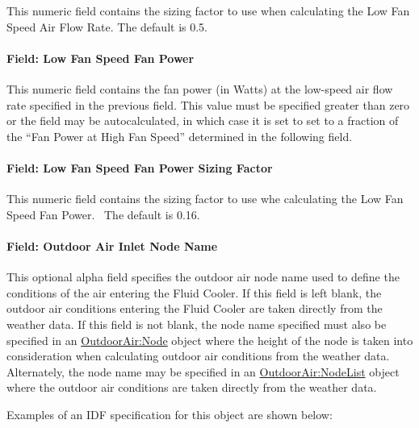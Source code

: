 This numeric field contains the sizing factor to use when calculating the Low Fan Speed Air Flow Rate. The default is 0.5.

\paragraph{Field: Low Fan Speed Fan Power}\label{field-low-fan-speed-fan-power-2}

This numeric field contains the fan power (in Watts) at the low-speed air flow rate specified in the previous field. This value must be specified greater than zero or the field may be autocalculated, in which case it is set to set to a fraction of the ``Fan Power at High Fan Speed'' determined in the following field.

\paragraph{Field: Low Fan Speed Fan Power Sizing Factor}\label{field-low-fan-speed-fan-power-sizing-factor-2}

This numeric field contains the sizing factor to use whe calculating the Low Fan Speed Fan Power.~ The default is 0.16.

\paragraph{Field: Outdoor Air Inlet Node Name}\label{field-outdoor-air-inlet-node-name-7}

This optional alpha field specifies the outdoor air node name used to define the conditions of the air entering the Fluid Cooler. If this field is left blank, the outdoor air conditions entering the Fluid Cooler are taken directly from the weather data. If this field is not blank, the node name specified must also be specified in an \hyperref[outdoorairnode]{OutdoorAir:Node} object where the height of the node is taken into consideration when calculating outdoor air conditions from the weather data. Alternately, the node name may be specified in an \hyperref[outdoorairnodelist]{OutdoorAir:NodeList} object where the outdoor air conditions are taken directly from the weather data.

Examples of an IDF specification for this object are shown below:

